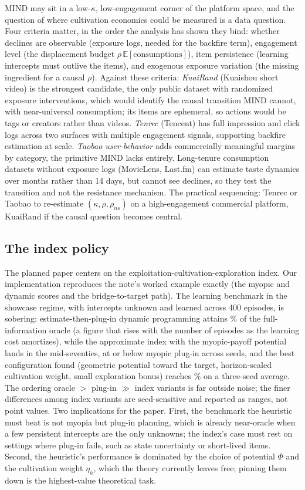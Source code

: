 \documentclass[11pt]{article}
\newcommand{\E}{\mathbb{E}}
\begin{document}
MIND may sit in a low-$\kappa$, low-engagement corner of the platform
space, and the question of where cultivation economics could be measured
is a data question. Four criteria matter, in the order the analysis has
shown they bind: whether declines are observable (exposure logs, needed
for the backfire term), engagement level (the displacement budget
$\rho\,\E[\text{consumptions}]$), item persistence (learning intercepts
must outlive the items), and exogenous exposure variation (the missing
ingredient for a causal $\rho$). Against these criteria:
\emph{KuaiRand} (Kuaishou short video) is the strongest candidate, the
only public dataset with randomized exposure interventions, which would
identify the causal transition MIND cannot, with near-universal
consumption; its items are ephemeral, so actions would be tags or
creators rather than videos. \emph{Tenrec} (Tencent) has full impression
and click logs across two surfaces with multiple engagement signals,
supporting backfire estimation at scale. \emph{Taobao user-behavior}
adds commercially meaningful margins by category, the primitive MIND
lacks entirely. Long-tenure consumption datasets without exposure logs
(MovieLens, Last.fm) can estimate taste dynamics over months rather than
14 days, but cannot see declines, so they test the transition and not
the resistance mechanism. The practical sequencing: Tenrec or Taobao to
re-estimate $(\kappa,\rho,\rho_{ns})$ on a high-engagement commercial
platform, KuaiRand if the causal question becomes central.

\subsection{The index policy}

The planned paper centers on the
exploitation-cultivation-exploration index. Our implementation
reproduces the note's worked example exactly (the myopic and dynamic
scores and the bridge-to-target path). The learning benchmark in the
showcase regime, with intercepts unknown and learned across 400
episodes, is sobering: estimate-then-plug-in dynamic programming attains
\idxplugin\% of the full-information oracle (a figure that rises with
the number of episodes as the learning cost amortizes), while the
approximate index with the myopic-payoff potential lands in the
mid-seventies, at or below myopic plug-in across seeds, and the best
configuration found (geometric potential toward the target,
horizon-scaled cultivation weight, small exploration bonus) reaches
\idxbest\% on a three-seed average. The ordering
oracle $>$ plug-in $\gg$ index variants is far outside noise; the finer
differences among index variants are seed-sensitive and reported as
ranges, not point values. Two implications for the paper. First, the benchmark the
heuristic must beat is not myopia but plug-in planning, which is already
near-oracle when a few persistent intercepts are the only unknowns;
the index's case must rest on settings where plug-in fails, such as
state uncertainty or short-lived items. Second, the heuristic's
performance is dominated by the choice of potential $\Phi$ and the
cultivation weight $\eta_h$, which the theory currently leaves free;
pinning them down is the highest-value theoretical task.
\end{document}
